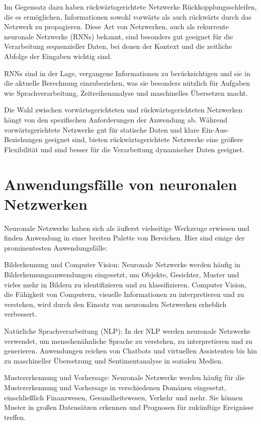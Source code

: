 Im Gegensatz dazu haben rückwärtsgerichtete Netzwerke Rückkopplungsschleifen, die es ermöglichen, Informationen sowohl vorwärts als auch rückwärts durch das Netzwerk zu propagieren. Diese Art von Netzwerken, auch als rekurrente neuronale Netzwerke (RNNs) bekannt, sind besonders gut geeignet für die Verarbeitung sequenzieller Daten, bei denen der Kontext und die zeitliche Abfolge der Eingaben wichtig sind.

RNNs sind in der Lage, vergangene Informationen zu berücksichtigen und sie in die aktuelle Berechnung einzubeziehen, was sie besonders nützlich für Aufgaben wie Sprachverarbeitung, Zeitreihenanalyse und maschinelles Übersetzen macht.

Die Wahl zwischen vorwärtsgerichteten und rückwärtsgerichteten Netzwerken hängt von den spezifischen Anforderungen der Anwendung ab. Während vorwärtsgerichtete Netzwerke gut für statische Daten und klare Ein-Aus-Beziehungen geeignet sind, bieten rückwärtsgerichtete Netzwerke eine größere Flexibilität und sind besser für die Verarbeitung dynamischer Daten geeignet.

\section{Anwendungsfälle von neuronalen Netzwerken}
\label{sec:Grundlagen_Anwendungsfälle}
Neuronale Netzwerke haben sich als äußerst vielseitige Werkzeuge erwiesen und finden Anwendung in einer breiten Palette von Bereichen. Hier sind einige der prominentesten Anwendungsfälle:

Bilderkennung und Computer Vision: Neuronale Netzwerke werden häufig in Bilderkennungsanwendungen eingesetzt, um Objekte, Gesichter, Muster und vieles mehr in Bildern zu identifizieren und zu klassifizieren. Computer Vision, die Fähigkeit von Computern, visuelle Informationen zu interpretieren und zu verstehen, wird durch den Einsatz von neuronalen Netzwerken erheblich verbessert.

Natürliche Sprachverarbeitung (NLP): In der NLP werden neuronale Netzwerke verwendet, um menschenähnliche Sprache zu verstehen, zu interpretieren und zu generieren. Anwendungen reichen von Chatbots und virtuellen Assistenten bis hin zu maschineller Übersetzung und Sentimentanalyse in sozialen Medien.

Mustererkennung und Vorhersage: Neuronale Netzwerke werden häufig für die Mustererkennung und Vorhersage in verschiedenen Domänen eingesetzt, einschließlich Finanzwesen, Gesundheitswesen, Verkehr und mehr. Sie können Muster in großen Datensätzen erkennen und Prognosen für zukünftige Ereignisse treffen.

